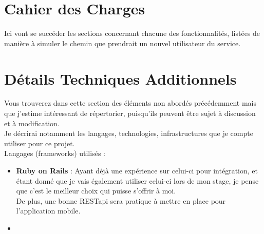 \documentclass[a4paper,10pt,final,fleqn]{article}
\begin{document}
	\section{Cahier des Charges}

		Ici vont se succéder les sections concernant chacune des fonctionnalités, listées de manière à simuler le chemin que prendrait un nouvel utilisateur du service.\\

	\section{Détails Techniques Additionnels}

		Vous trouverez dans cette section des éléments non abordés précédemment mais que j'estime intéressant de répertorier, puisqu'ils peuvent être sujet à discussion et à modification.\\
		Je décrirai notamment les langages, technologies, infrastructures que je compte utiliser pour ce projet.\\

		Langages (frameworks) utilisés : \\

		\begin{itemize}
			\item \textbf{Ruby on Rails} : Ayant déjà une expérience sur celui-ci pour intégration, et étant donné que je vais également utiliser celui-ci lors de mon stage, je pense que c'est le meilleur choix qui puisse s'offrir à moi.\\
			De plus, une bonne RESTapi sera pratique à mettre en place pour l'application mobile.\\

			 \item \textbf{}
		\end{itemize}
\end{document}
